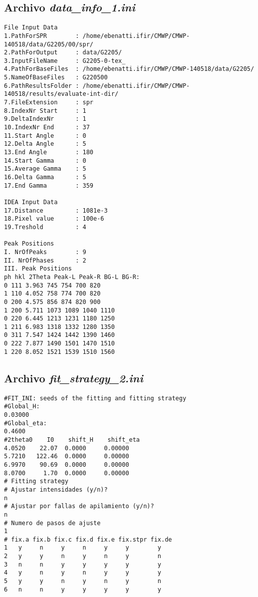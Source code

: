 \subsection{Archivo \textit{data\_info\_1.ini}}
\begin{lstlisting}
File Input Data
1.PathForSPR        : /home/ebenatti.ifir/CMWP/CMWP-140518/data/G2205/00/spr/
2.PathForOutput     : data/G2205/
3.InputFileName     : G2205-0-tex_
4.PathForBaseFiles  : /home/ebenatti.ifir/CMWP/CMWP-140518/data/G2205/
5.NameOfBaseFiles   : G220500
6.PathResultsFolder : /home/ebenatti.ifir/CMWP/CMWP-140518/results/evaluate-int-dir/
7.FileExtension     : spr
8.IndexNr Start     : 1
9.DeltaIndexNr      : 1
10.IndexNr End      : 37
11.Start Angle      : 0
12.Delta Angle      : 5
13.End Angle        : 180
14.Start Gamma      : 0
15.Average Gamma    : 5
16.Delta Gamma      : 5
17.End Gamma        : 359

IDEA Input Data
17.Distance         : 1081e-3
18.Pixel value      : 100e-6
19.Treshold         : 4

Peak Positions
I. NrOfPeaks        : 9
II. NrOfPhases      : 2
III. Peak Positions
ph hkl 2Theta Peak-L Peak-R BG-L BG-R:
0 111 3.963 745 754 700 820
1 110 4.052 758 774 700 820
0 200 4.575 856 874 820 900
1 200 5.711 1073 1089 1040 1110
0 220 6.445 1213 1231 1180 1250
1 211 6.983 1318 1332 1280 1350
0 311 7.547 1424 1442 1390 1460
0 222 7.877 1490 1501 1470 1510
1 220 8.052 1521 1539 1510 1560
\end{lstlisting}

\hypertarget{fitstrategy}{}
\subsection{Archivo \textit{fit\_strategy\_2.ini}}
\begin{lstlisting}
#FIT_INI: seeds of the fitting and fitting strategy
#Global_H:
0.03000   
#Global_eta:
0.4600     
#2theta0    I0    shift_H    shift_eta
4.0520    22.07  0.0000     0.00000 
5.7210   122.46  0.0000     0.00000
6.9970    90.69  0.0000     0.00000
8.0700     1.70  0.0000     0.00000
# Fitting strategy
# Ajustar intensidades (y/n)?
n
# Ajustar por fallas de apilamiento (y/n)?
n
# Numero de pasos de ajuste
1
# fix.a fix.b fix.c fix.d fix.e fix.stpr fix.de
1   y     n     y     n     y     y        y
2   y     y     n     y     n     y        n
3   n     n     y     y     y     y        y
4   y     n     y     n     y     y        y
5   y     y     n     y     n     y        n
6   n     n     y     y     y     y        y
\end{lstlisting}

